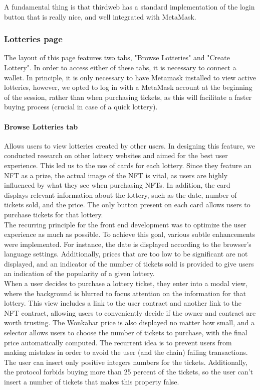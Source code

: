 A fundamental thing is that thirdweb has a standard implementation of the login button that is really nice, and well integrated with MetaMask.

\subsubsection{Lotteries page}
The layout of this page features two tabs, "Browse Lotteries" and "Create Lottery". In order to access either of these tabs, it is necessary to connect a wallet. In principle, it is only necessary to have Metamask installed to view active lotteries, however, we opted to log in with a MetaMask account at the beginning of the session, rather than when purchasing tickets, as this will facilitate a faster buying process (crucial in case of a quick lottery).
\paragraph{Browse Lotteries tab} Allows users to view lotteries created by other users. In designing this feature, we conducted research on other lottery websites and aimed for the best user experience. This led us to the use of cards for each lottery. Since they feature an NFT as a prize, the actual image of the NFT is vital, as users are highly influenced by what they see when purchasing NFTs. In addition, the card displays relevant information about the lottery, such as the date, number of tickets sold, and the price. The only button present on each card allows users to purchase tickets for that lottery.\\
The recurring principle for the front end development was to optimize the user experience as much as possible. To achieve this goal, various subtle enhancements were implemented. For instance, the date is displayed according to the browser's language settings. Additionally, prices that are too low to be significant are not displayed, and an indicator of the number of tickets sold is provided to give users an indication of the popularity of a given lottery.
\\
\indent When a user decides to purchase a lottery ticket, they enter into a modal view, where the background is blurred to focus attention on the information for that lottery. This view includes a link to the user contract and another link to the NFT contract, allowing users to conveniently decide if the owner and contract are worth trusting. The Wonkabar price is also displayed no matter how small, and a selector allows users to choose the number of tickets to purchase, with the final price automatically computed. The recurrent idea is to prevent users from making mistakes in order to avoid the user (and the chain) failing transactions. The user can insert only positive integers numbers for the tickets. Additionally, the protocol forbids buying more than 25 percent of the tickets, so the user can't insert a number of tickets that makes this property false.
